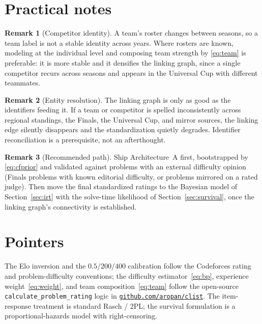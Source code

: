 \documentclass[11pt]{article}
\theoremstyle{definition}
\newtheorem{remark}{Remark}
\begin{document}
\section{Practical notes}\label{sec:notes}

\begin{remark}[Competitor identity]\label{rem:identity}
A team's roster changes between seasons, so a team label is not a stable
identity across years. Where rosters are known, modeling at the individual level
and composing team strength by \eqref{eq:team} is preferable: it is more stable
and it densifies the linking graph, since a single competitor recurs across
seasons and appears in the Universal Cup with different teammates.
\end{remark}

\begin{remark}[Entity resolution]
The linking graph is only as good as the identifiers feeding it. If a team or
competitor is spelled inconsistently across regional standings, the Finals, the
Universal Cup, and mirror sources, the linking edge silently disappears and the
standardization quietly degrades. Identifier reconciliation is a prerequisite,
not an afterthought.
\end{remark}

\begin{remark}[Recommended path]
Ship Architecture~A first, bootstrapped by \eqref{eq:cfprior} and validated
against problems with an external difficulty opinion (Finals problems with known
editorial difficulty, or problems mirrored on a rated judge). Then move the final
standardized ratings to the Bayesian model of Section~\ref{sec:irt} with the
solve-time likelihood of Section~\ref{sec:survival}, once the linking graph's
connectivity is established.
\end{remark}

\section*{Pointers}
\small
The Elo inversion and the $0.5/200/400$ calibration follow the Codeforces rating
and problem-difficulty conventions; the difficulty estimator~\eqref{eq:bp},
experience weight~\eqref{eq:weight}, and team composition~\eqref{eq:team} follow
the open-source \texttt{calculate\_problem\_rating} logic in
\href{https://github.com/aropan/clist}{\texttt{github.com/aropan/clist}}. The
item-response treatment is standard Rasch / 2PL; the survival formulation is a
proportional-hazards model with right-censoring.
\end{document}
